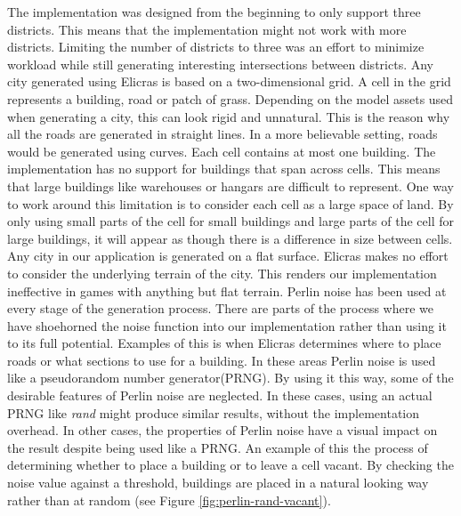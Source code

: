 	The implementation was designed from the beginning to only support three districts. This means that the implementation might not work with more districts. Limiting the number of districts to three was an effort to minimize workload while still generating interesting intersections between districts.
	Any city generated using Elicras is based on a two-dimensional grid. A cell in the grid represents a building, road or patch of grass. Depending on the model assets used when generating a city, this can look rigid and unnatural. This is the reason why all the roads are generated in straight lines. In a more believable setting, roads would be generated using curves\cite{CurvedRoads}.
	Each cell contains at most one building. The implementation has no support for buildings that span across cells. This means that large buildings like warehouses or hangars are difficult to represent. One way to work around this limitation is to consider each cell as a large space of land. By only using small parts of the cell for small buildings and large parts of the cell for large buildings, it will appear as though there is a difference in size between cells.
	Any city in our application is generated on a flat surface. Elicras makes no effort to consider the underlying terrain of the city. This renders our implementation ineffective in games with anything but flat terrain.
	Perlin noise has been used at every stage of the generation process. There are parts of the process where we have shoehorned the noise function into our implementation rather than using it to its full potential. Examples of this is when Elicras determines where to place roads or what sections to use for a building. In these areas Perlin noise is used like a pseudorandom number generator(PRNG). By using it this way, some of the desirable features of Perlin noise are neglected. In these cases, using an actual PRNG like \textit{rand}\cite{RandCRT} might produce similar results, without the implementation overhead. In other cases, the properties of Perlin noise have a visual impact on the result despite being used like a PRNG. An example of this the process of determining whether to place a building or to leave a cell vacant. By checking the noise value against a threshold, buildings are placed in a natural looking way rather than at random (see Figure \ref{fig:perlin-rand-vacant}).
	
